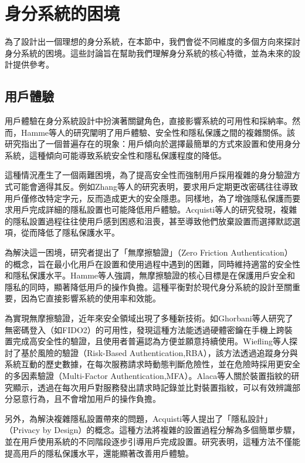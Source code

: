 \section{身分系統的困境}
為了設計出一個理想的身分系統，在本節中，我們會從不同維度的多個方向來探討身分系統的困境。這些討論旨在幫助我們理解身分系統的核心特徵，並為未來的設計提供參考。
\subsection{用戶體驗}
用戶體驗在身分系統設計中扮演著關鍵角色，直接影響系統的可用性和採納率。然而，Hamme等人\cite{inproceedings}的研究闡明了用戶體驗、安全性和隱私保護之間的複雜關係。該研究指出了一個普遍存在的現象：用戶傾向於選擇最簡單的方式來設置和使用身分系統，這種傾向可能導致系統安全性和隱私保護程度的降低。

這種情況產生了一個兩難困境，為了提高安全性而強制用戶採用複雜的身分驗證方式可能會適得其反。例如Zhang等人\cite{zhang2010security}的研究表明，要求用戶定期更改密碼往往導致用戶僅修改特定字元，反而造成更大的安全隱患。同樣地，為了增強隱私保護而要求用戶完成詳細的隱私設置也可能降低用戶體驗。Acquisti等人\cite{acquisti2017nudges}的研究發現，複雜的隱私設置過程往往使用戶感到困惑和沮喪，甚至導致他們放棄設置而選擇默認選項，從而降低了隱私保護水平。

為解決這一困境，研究者提出了「無摩擦驗證」（Zero Friction Authentication）的概念，旨在最小化用戶在設置和使用過程中遇到的困難，同時維持適當的安全性和隱私保護水平。Hamme等人\cite{inproceedings}強調，無摩擦驗證的核心目標是在保護用戶安全和隱私的同時，顯著降低用戶的操作負擔。這種平衡對於現代身分系統的設計至關重要，因為它直接影響系統的使用率和效能。

為實現無摩擦驗證，近年來安全領域出現了多種新技術。如Ghorbani等人\cite{ghorbani2020fido2}研究了無密碼登入（如FIDO2）的可用性，發現這種方法能透過硬體密鑰在手機上跨裝置完成高安全性的驗證，且使用者普遍認為方便並願意持續使用。Wiefling等人\cite{wiefling2021rba}探討了基於風險的驗證（Risk-Based Authentication,RBA），該方法透過追蹤身分與系統互動的歷史數據，在每次服務請求時動態判斷危險性，並在危險時採用更安全的多因素驗證（Multi-Factor Authentication,MFA）\cite{bonneau2012mfa}。Alaca等人\cite{alaca2016devicefingerprinting}關於裝置指紋的研究顯示，透過在每次用戶對服務發出請求時記錄並比對裝置指紋，可以有效辨識部分惡意行為，且不會增加用戶的操作負擔。

另外，為解決複雜隱私設置帶來的問題，Acquisti等人\cite{acquisti2017nudges}提出了「隱私設計」（Privacy by Design）的概念。這種方法將複雜的設置過程分解為多個簡單步驟，並在用戶使用系統的不同階段逐步引導用戶完成設置。研究表明，這種方法不僅能提高用戶的隱私保護水平，還能顯著改善用戶體驗。

